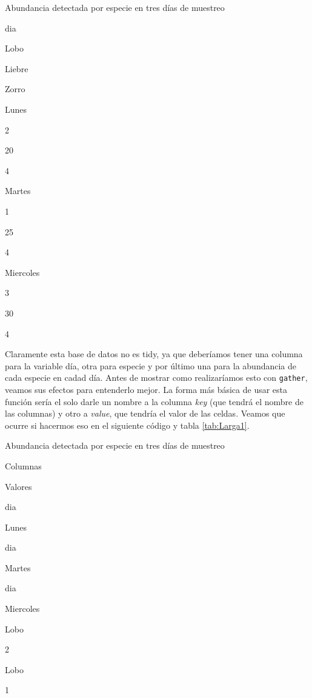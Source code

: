 \documentclass[]{book}
\newenvironment{Shaded}{\begin{snugshade}}{\end{snugshade}}
\newcommand{\DataTypeTok}[1]{\textcolor[rgb]{0.13,0.29,0.53}{#1}}
\newcommand{\KeywordTok}[1]{\textcolor[rgb]{0.13,0.29,0.53}{\textbf{#1}}}
\newcommand{\NormalTok}[1]{#1}
\newcommand{\OperatorTok}[1]{\textcolor[rgb]{0.81,0.36,0.00}{\textbf{#1}}}
\newcommand{\StringTok}[1]{\textcolor[rgb]{0.31,0.60,0.02}{#1}}
\begin{document}
\label{tab:Censo}Abundancia detectada por especie en tres días de muestreo

dia

Lobo

Liebre

Zorro

Lunes

2

20

4

Martes

1

25

4

Miercoles

3

30

4

Claramente esta base de datos no es tidy, ya que deberíamos tener una
columna para la variable día, otra para especie y por último una para la
abundancia de cada especie en cadad día. Antes de mostrar como
realizaríamos esto con \texttt{gather}, veamos sus efectos para
entenderlo mejor. La forma más básica de usar esta función sería el solo
darle un nombre a la columna \emph{key} (que tendrá el nombre de las
columnas) y otro a \emph{value}, que tendría el valor de las celdas.
Veamos que ocurre si hacermos eso en el siguiente código y tabla
\ref{tab:Larga1}.

\begin{Shaded}
\end{Shaded}

\label{tab:Larga1}Abundancia detectada por especie en tres días de muestreo

Columnas

Valores

dia

Lunes

dia

Martes

dia

Miercoles

Lobo

2

Lobo

1
\end{document}
